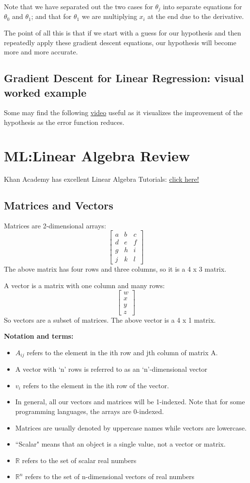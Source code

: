Note that we have separated out the two cases for $\theta_j$ into separate equations for $\theta_0 $ and $\theta_1$; and that for $\theta_1$ we are multiplying $x_{i}$ at the end due to the derivative.

The point of all this is that if we start with a guess for our hypothesis and then repeatedly apply these gradient descent equations, our hypothesis will become more and more accurate.
\subsection*{Gradient Descent for Linear Regression: visual worked example}
Some may find the following \href{https://www.youtube.com/watch?v=WnqQrPNYz5Q}{video} useful as it visualizes the improvement of the hypothesis as the error function reduces.
\section*{ML:Linear Algebra Review}
Khan Academy has excellent Linear Algebra Tutorials: \href{https://www.khanacademy.org/#linear-algebra}{click here!}
\subsection*{Matrices and Vectors}
Matrices are 2-dimensional arrays:
\[
\begin{bmatrix}  
a & b & c \\   
d & e & f \\   
g & h & i \\   
j & k & l
\end{bmatrix}
\]
The above matrix has four rows and three columns, so it is a 4 x 3 matrix.

A vector is a matrix with one column and many rows:
\[
\begin{bmatrix}  
w \\  
x \\
y \\
z 
\end{bmatrix}
\]
So vectors are a subset of matrices. The above vector is a 4 x 1 matrix.

{\bf Notation and terms:}
\begin{itemize}
	\item $A_{ij}$ refers to the element in the ith row and jth column of matrix A.
	\item A vector with `n' rows is referred to as an `n'-dimensional vector
	\item $v_i$ refers to the element in the ith row of the vector.
	\item In general, all our vectors and matrices will be 1-indexed. Note that for some programming languages, the arrays are 0-indexed.
	\item Matrices are usually denoted by uppercase names while vectors are lowercase.
	\item ``Scalar" means that an object is a single value, not a vector or matrix.
	\item $\mathbb{R}$ refers to the set of scalar real numbers
	\item $\mathbb{R}^n$ refers to the set of n-dimensional vectors of real numbers
\end{itemize}
